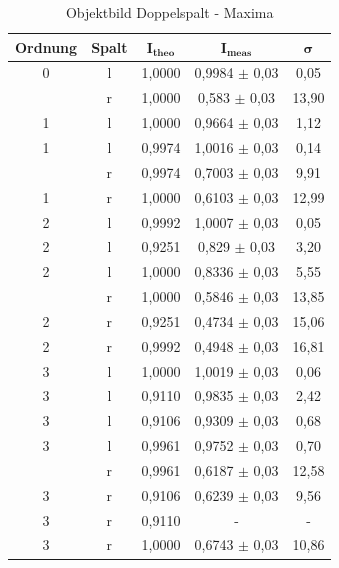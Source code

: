 \documentclass{article}
\begin{document}
\begin{table}[!p]
    \centering
    \begin{tabular}{ccccc}
        \hline
        \textbf{Ordnung} & \textbf{Spalt} & $\bm{I_{theo}}$ & $\bm{I_{meas}}$ & $\bm{\sigma}$ \\ \hline
             0 & l & 1,0000 &                 0,9984 $\pm$ 0,03 &    0,05 \\ \hdashline
             0 & r & 1,0000 &                 0,583  $\pm$ 0,03 &   13,90  \\ \hline
             1 & l & 1,0000 &                 0,9664 $\pm$ 0,03 &    1,12 \\
             1 & l & 0,9974 &                 1,0016 $\pm$ 0,03 &    0,14 \\ \hdashline
             1 & r & 0,9974 &                 0,7003 $\pm$ 0,03 &    9,91 \\
             1 & r & 1,0000 &                 0,6103 $\pm$ 0,03 &   12,99 \\ \hline
             2 & l & 0,9992 &                 1,0007 $\pm$ 0,03 &    0,05 \\
             2 & l & 0,9251 &                 0,829  $\pm$ 0,03 &    3,20  \\
             2 & l & 1,0000 &                 0,8336 $\pm$ 0,03 &    5,55 \\ \hdashline
             2 & r & 1,0000 &                 0,5846 $\pm$ 0,03 &   13,85 \\
             2 & r & 0,9251 &                 0,4734 $\pm$ 0,03 &   15,06 \\
             2 & r & 0,9992 &                 0,4948 $\pm$ 0,03 &   16,81 \\ \hline
             3 & l & 1,0000 &                 1,0019 $\pm$ 0,03 &    0,06 \\
             3 & l & 0,9110 &                 0,9835 $\pm$ 0,03 &    2,42 \\
             3 & l & 0,9106 &                 0,9309 $\pm$ 0,03 &    0,68 \\
             3 & l & 0,9961 &                 0,9752 $\pm$ 0,03 &    0,70  \\ \hdashline
             3 & r & 0,9961 &                 0,6187 $\pm$ 0,03 &   12,58 \\
             3 & r & 0,9106 &                 0,6239 $\pm$ 0,03 &    9,56 \\
             3 & r & 0,9110 &                - &  -    \\
             3 & r & 1,0000 &                 0,6743 $\pm$ 0,03 &   10,86 \\ \hline
    \end{tabular}%
    \caption{Objektbild Doppelspalt - Maxima}
    \label{tab:Doppel_Obj_Maxima}
\end{table}
\end{document}
